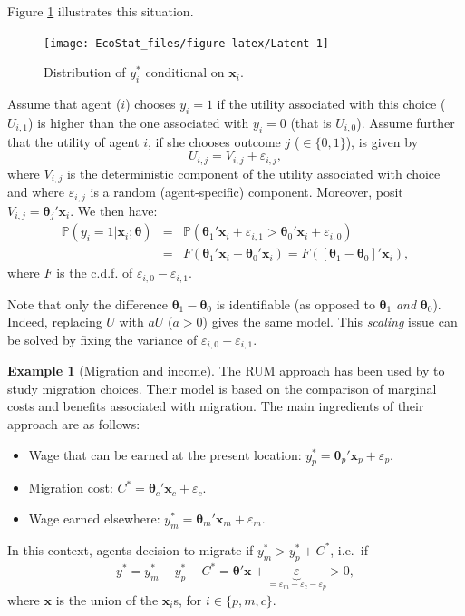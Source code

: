 \documentclass[
  12pt,
]{book}
\providecommand{\tightlist}{%
  \setlength{\itemsep}{0pt}\setlength{\parskip}{0pt}}
\theoremstyle{definition}
\theoremstyle{definition}
\newtheorem{example}{Example}[chapter]
\theoremstyle{definition}
\theoremstyle{definition}
\theoremstyle{remark}
\begin{document}
Figure \ref{fig:Latent} illustrates this situation.

\begin{figure}
\texttt{[image: EcoStat\_files/figure-latex/Latent-1]} \caption{Distribution of $y_i^*$ conditional on $\mathbf{x}_i$.}\label{fig:Latent}
\end{figure}

Assume that agent (\(i\)) chooses \(y_i=1\) if the utility associated with this choice (\(U_{i,1}\)) is higher than the one associated with \(y_i=0\) (that is \(U_{i,0}\)). Assume further that the utility of agent \(i\), if she chooses outcome \(j\) (\(\in \{0,1\}\)), is given by
\[
U_{i,j} = V_{i,j} + \varepsilon_{i,j},
\]
where \(V_{i,j}\) is the deterministic component of the utility associated with choice and where \(\varepsilon_{i,j}\) is a random (agent-specific) component. Moreover, posit \(V_{i,j} = \boldsymbol\theta_j'\mathbf{x}_i\). We then have:
\begin{eqnarray}
\mathbb{P}(y_i = 1|\mathbf{x}_i;\boldsymbol\theta) &=& \mathbb{P}(\boldsymbol\theta_1'\mathbf{x}_i+\varepsilon_{i,1}>\boldsymbol\theta_0'\mathbf{x}_i+\varepsilon_{i,0}) \nonumber\\
&=& F(\boldsymbol\theta_1'\mathbf{x}_i-\boldsymbol\theta_0'\mathbf{x}_i) = F([\boldsymbol\theta_1-\boldsymbol\theta_0]'\mathbf{x}_i),\label{eq:utility}
\end{eqnarray}
where \(F\) is the c.d.f. of \(\varepsilon_{i,0}-\varepsilon_{i,1}\).

Note that only the difference \(\boldsymbol\theta_1-\boldsymbol\theta_0\) is identifiable (as opposed to \(\boldsymbol\theta_1\) \emph{and} \(\boldsymbol\theta_0\)). Indeed, replacing \(U\) with \(aU\) (\(a>0\)) gives the same model. This \emph{scaling} issue can be solved by fixing the variance of \(\varepsilon_{i,0}-\varepsilon_{i,1}\).

\begin{example}[Migration and income]
\protect\hypertarget{exm:migration}{}\label{exm:migration}The RUM approach has been used by \citet{Nakosteen_Zimmer_1980} to study migration choices. Their model is based on the comparison of marginal costs and benefits associated with migration. The main ingredients of their approach are as follows:

\begin{itemize}
\tightlist
\item
  Wage that can be earned at the present location: \(y_p^* = \boldsymbol\theta_p'\mathbf{x}_p + \varepsilon_p\).
\item
  Migration cost: \(C^*= \boldsymbol\theta_c'\mathbf{x}_c + \varepsilon_c\).
\item
  Wage earned elsewhere: \(y_m^* = \boldsymbol\theta_m'\mathbf{x}_m + \varepsilon_m\).
\end{itemize}

In this context, agents decision to migrate if \(y_m^* > y_p^* + C^*\), i.e.~if
\[
y^* = y_m^* -  y_p^* - C^* =  \boldsymbol\theta'\mathbf{x} + \underbrace{\varepsilon}_{=\varepsilon_m - \varepsilon_c - \varepsilon_p}>0,
\]
where \(\mathbf{x}\) is the union of the \(\mathbf{x}_i\)s, for \(i \in \{p,m,c\}\).
\end{example}
\end{document}
